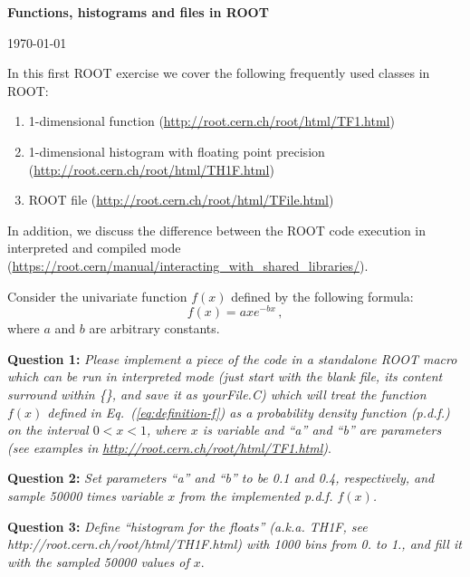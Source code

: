 \documentclass[11pt]{article}
\begin{document}
\begin{center}
\Large{\bf{Functions, histograms and files in ROOT}}\\
\end{center}
\begin{center}
{\small\today}
\end{center}

\bigskip

\noindent In this first ROOT exercise we cover the following frequently used classes in ROOT:
%
\begin{enumerate}
\item 1-dimensional function (\url{http://root.cern.ch/root/html/TF1.html})
\item 1-dimensional histogram with floating point precision (\url{http://root.cern.ch/root/html/TH1F.html})
\item ROOT file (\url{http://root.cern.ch/root/html/TFile.html}) 
\end{enumerate} 
In addition, we discuss the difference between the ROOT code execution in interpreted and compiled mode (\url{https://root.cern/manual/interacting_with_shared_libraries/}).
%

\bigskip\bigskip\bigskip

\noindent Consider the univariate function $f(x)$ defined by the following formula:
% 
\begin{equation}
f(x) = axe^{-bx}\,,
\label{eq:definition-f}
\end{equation}
%
where $a$ and $b$ are arbitrary constants.

\bigskip

\noindent\textbf{Question 1:} {\it Please implement a piece of the code in a standalone ROOT macro which can be run in interpreted mode (just start with the blank file, its content surround within \{\}, and save it as yourFile.C) which will treat the function $f(x)$ defined in Eq.~(\ref{eq:definition-f}) as a probability density function (p.d.f.) on the interval $0 < x < 1$, where $x$ is variable and ``a'' and ``b'' are parameters (see examples in \url{http://root.cern.ch/root/html/TF1.html})}.

\bigskip

\noindent\textbf{Question 2:} {\it Set parameters ``a'' and ``b'' to be 0.1 and 0.4, respectively, and sample 50000 times variable $x$ from the implemented p.d.f. $f(x)$.}

\bigskip

\noindent\textbf{Question 3:} {\it Define ``histogram for the floats'' (a.k.a. TH1F, see http://root.cern.ch/root/html/TH1F.html) with 1000 bins from 0. to 1., and fill it with the sampled 50000 values of $x$}.
\end{document}
